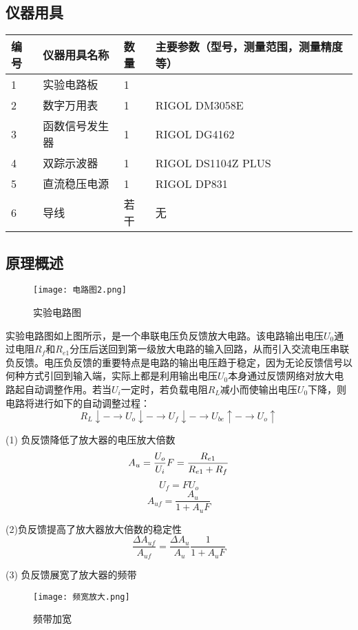 \documentclass[dvipsnames, svgnames,a4paper,11pt]{article}
\begin{document}
	\subsection{仪器用具}
	\begin{table}[htbp]
		\centering
		\renewcommand\arraystretch{1.6}
		\begin{tabular}{p{}|p{}|p{}|p{}}
			\hline
			编号 & 仪器用具名称 & 数量 & 主要参数（型号，测量范围，测量精度等） \\
\hline
1 & 实验电路板 & 1 &  \\
2 & 数字万用表 & 1 & RIGOL DM3058E \\
3 & 函数信号发生器 & 1 & RIGOL DG4162 \\
4 & 双踪示波器 & 1 & RIGOL DS1104Z PLUS \\
5 & 直流稳压电源 & 1 & RIGOL DP831 \\
6 & 导线 & 若干 & 无 \\
			\hline
		\end{tabular}
	\end{table}
	
	\subsection{原理概述}
	\begin{figure}[{H}]
		\centering
		\texttt{[image: 电路图2.png]}
		\caption{实验电路图}
		\label{}
	\end{figure}
	实验电路图如上图所示，是一个串联电压负反馈放大电路。该电路输出电压$U_0$通过电阻$R_f$和$R_{e1}$分压后送回到第一级放大电路的输入回路，从而引入交流电压串联负反馈。电压负反馈的重要特点是电路的输出电压趋于稳定，因为无论反馈信号以何种方式引回到输入端，实际上都是利用输出电压$U_0$本身通过反馈网络对放大电路起自动调整作用。若当$U_i$一定时，若负载电阻$R_L$减小而使输出电压$U_0$下降，则电路将进行如下的自动调整过程：
	$$R_{L}\downarrow-\rightarrow U_{o}\downarrow-\rightarrow U_{f}\downarrow-\rightarrow U_{be}\uparrow-\rightarrow U_{o}\uparrow $$

	 (1) 负反馈降低了放大器的电压放大倍数
$$A_{u}=\frac{U_{o}}{U_{i}}\\F=\frac{R_{e1}}{R_{e1}+R_{f}}$$
$$U_{f}=FU_{o}$$
$$A_{uf}=\frac{A_{u}}{1+A_{u}F}$$

(2)负反馈提高了放大器放大倍数的稳定性
$$\frac{\Delta A_{uf}}{A_{uf}}=\frac{\Delta A_{u}}{A_{u}}\frac{1}{1+A_{u}F}$$

 (3) 负反馈展宽了放大器的频带
	\begin{figure}[{H}]
		\centering
		\texttt{[image: 频宽放大.png]}
		\caption{频带加宽}
		\label{}
	\end{figure}
	
\end{document}
